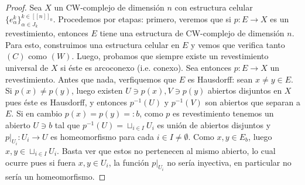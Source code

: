 \documentclass[11pt]{article}
\newcommand{\nat}[1]{[\![#1]\!]}
\newcommand{\natzero}[1]{\nat{#1}_0}
\begin{document}
\begin{proof} Sea $X$ un CW-complejo de dimensi\'on $n$ con estructura celular $\{e^{k}_\alpha\}_{\alpha \in J_k}^{k \in \natzero{n}}$. Procedemos por etapas: primero, veremos que si $p : E \to X$ es un revestimiento, entonces $E$ tiene una estructura de CW-complejo de dimensi\'on $n$. Para esto, construimos una estructura celular en $E$ y vemos que verifica tanto $(C)$ como $(W)$. Luego, probamos que siempre existe un revestimiento universal de $X$ si \'este es arcoconexo (i.e. conexo). Sea entonces $p : E \to X$ un revestimiento. Antes que nada, verfiquemos que $E$ es Hausdorff: sean $x \neq y \in E$. Si $p(x) \neq p(y)$, luego existen $U \ni p(x), V \ni p(y)$ abiertos disjuntos en $X$ pues \'este es Hausdorff, y entonces $p^{-1}(U)$ y $p^{-1}(V)$ son abiertos que separan a $E$. Si en cambio $p(x) = p(y) =: b$, como $p$ es revestimiento tenemos un abierto $U \ni b$ tal que $p^{-1}(U) = \sqcup_{i \in I} U_i$ es uni\'on de abiertos disjuntos y $p|_{U_i} : U_i \to U$ es homeomorfismo para cada $i \in I \neq \emptyset$. Como $x,y \in E_b$, luego $x,y \in \sqcup_{i \in I}U_i$. Basta ver que estos no pertenecen al mismo abierto, lo cual ocurre pues si fuera $x,y \in U_i$, la funci\'on $p|_{U_i}$ no ser\'ia inyectiva, en particular no ser\'ia un homeomorfismo. 



\end{proof}
\end{document}
